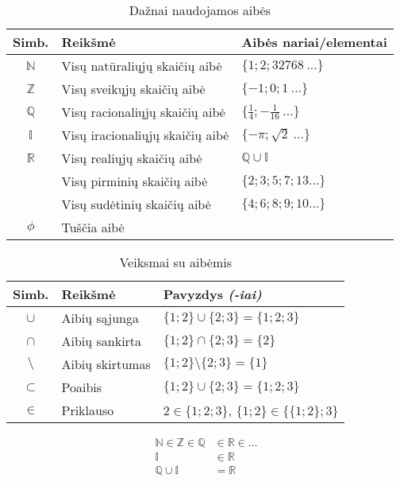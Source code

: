 \begin{table}[h]
\begin{tabular}{c|l|l}
    
    Simb. & Reikšmė                                 & Aibės nariai/elementai \\
    \hline
    $\mathbb{N}$ & Visų natūraliųjų skaičių aibė    & $\{1; 2; 32768\:\dots\}$ \\
    $\mathbb{Z}$ & Visų sveikųjų skaičių aibė       & $\{-1; 0; 1\:\dots\}$ \\
    $\mathbb{Q}$ & Visų racionaliųjų skaičių aibė   & $\{\frac{1}{4}; -\frac{1}{16}\:\dots\}$ \\
    $\mathbb{I}$ & Visų iracionaliųjų skaičių aibė  & $\{-\pi; \sqrt{2}\:\dots\}$ \\
    $\mathbb{R}$ & Visų realiųjų skaičių aibė       & $\mathbb{Q} \cup \mathbb{I}$ \\
                 & Visų pirminių skaičių aibė       & $\{2; 3; 5; 7; 13 \dots \}$ \\
                 & Visų sudėtinių skaičių aibė      & $\{4; 6; 8; 9; 10\dots\}$ \\
    $\phi$       & Tuščia aibė                      &
\end{tabular}
\caption[Dažnai naudojamos aibės]{Dažnai naudojamos aibės}
\label{table:data}
\end{table} 

\begin{table}[h]
    \begin{tabular}{c|l|l}

        Simb. & Reikšmė                 & Pavyzdys \textit{(-iai)} \\
        \hline
        $\cup$      & Aibių sąjunga     & $\{1; 2\} \cup \{2; 3\} = \{1; 2; 3\}$ \\
        $\cap$      & Aibių sankirta    & $\{1; 2\} \cap \{2; 3\} = \{2\}$ \\
        $\setminus$ & Aibių skirtumas   & $\{1; 2\} \setminus \{2; 3\} = \{1\}$ \\
        $\subset$   & Poaibis           & $\{1; 2\} \cup \{2; 3\} = \{1; 2; 3\}$ \\
        $\in$       & Priklauso         & $2 \in \{1; 2; 3\}$, $\{1; 2\} \in \{\{1; 2\}; 3\}$ \\
    \end{tabular}
    \caption[Veiksmai su aibėmis]{Veiksmai su aibėmis}
\end{table} 

\begin{align}
    \mathbb{N} \in \mathbb{Z} \in \mathbb{Q} & \in \mathbb{R} \in \dots \\
    \mathbb{I} & \in \mathbb{R} \\
    \mathbb{Q} \cup \mathbb{I} & = \mathbb{R}
\end{align}

